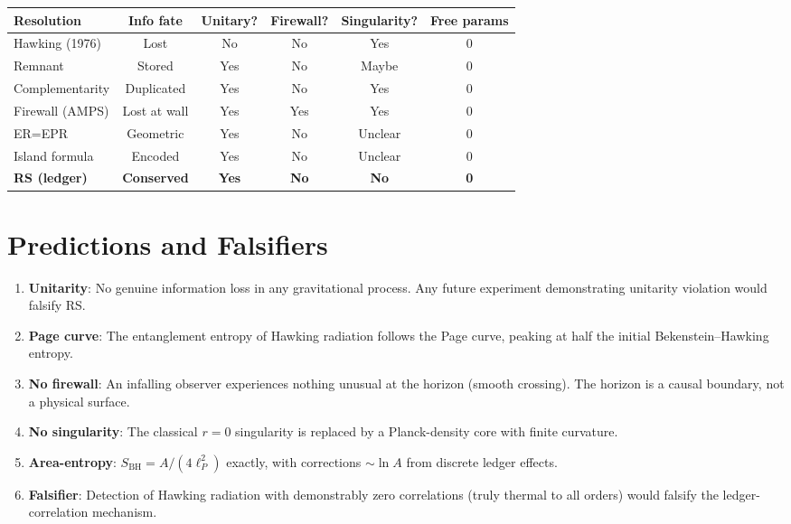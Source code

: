 \documentclass[12pt,a4paper]{article}
\theoremstyle{definition}
\theoremstyle{remark}
\begin{document}
\begin{center}
\renewcommand{\arraystretch}{1.3}
\begin{tabular}{@{}lccccc@{}}
\toprule
\textbf{Resolution} & \textbf{Info fate} & \textbf{Unitary?} &
\textbf{Firewall?} & \textbf{Singularity?} &
\textbf{Free params} \\
\midrule
Hawking (1976) & Lost & No & No & Yes & 0 \\
Remnant & Stored & Yes & No & Maybe & 0 \\
Complementarity & Duplicated & Yes & No & Yes & 0 \\
Firewall (AMPS) & Lost at wall & Yes & Yes & Yes & 0 \\
ER=EPR & Geometric & Yes & No & Unclear & 0 \\
Island formula & Encoded & Yes & No & Unclear & 0 \\
\textbf{RS (ledger)} & \textbf{Conserved} & \textbf{Yes} &
\textbf{No} & \textbf{No} & \textbf{0} \\
\bottomrule
\end{tabular}
\end{center}

\section{Predictions and Falsifiers}
\label{sec:predictions}

\begin{enumerate}
  \item \textbf{Unitarity}: No genuine information loss in any
  gravitational process.  Any future experiment demonstrating
  unitarity violation would falsify RS.

  \item \textbf{Page curve}: The entanglement entropy of Hawking
  radiation follows the Page curve, peaking at half the initial
  Bekenstein--Hawking entropy.

  \item \textbf{No firewall}: An infalling observer experiences
  nothing unusual at the horizon (smooth crossing).  The horizon
  is a causal boundary, not a physical surface.

  \item \textbf{No singularity}: The classical $r = 0$ singularity
  is replaced by a Planck-density core with finite curvature.

  \item \textbf{Area-entropy}: $S_{\mathrm{BH}} = A/(4\ell_P^2)$
  exactly, with corrections $\sim \ln A$ from discrete ledger
  effects.

  \item \textbf{Falsifier}: Detection of Hawking radiation with
  demonstrably zero correlations (truly thermal to all orders)
  would falsify the ledger-correlation mechanism.
\end{enumerate}
\end{document}

